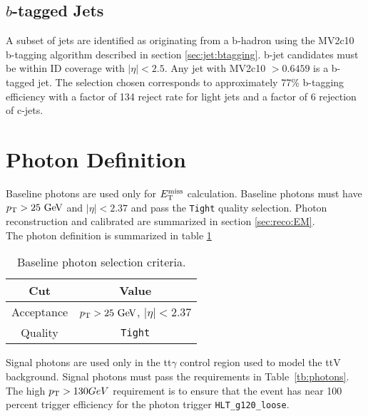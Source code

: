 \subsection{\boldmath $b$-tagged Jets}

\indent A subset of jets are identified as originating from a b-hadron using the MV2c10 b-tagging algorithm described in section \ref{sec:jet:btagging}.  b-jet candidates must be within ID coverage with $|\eta|<2.5$.  Any jet with MV2c10 $ > 0.6459$ is a b-tagged jet.  The selection chosen corresponds to approximately 77\% b-tagging efficiency with a factor of 134 reject rate for light jets and a factor of 6 rejection of c-jets.\\

\section{Photon Definition}
\label{sec:PhoDef}

\indent Baseline photons are used only for $E_{\mathrm{T}}^{\mathrm{miss}}$ calculation.  Baseline photons must have $\pt > 25 \gev$ and $|\eta| < 2.37$ and pass the {\tt Tight} quality selection.  Photon reconstruction and calibrated are summarized in section \ref{sec:reco:EM}. \\

\indent The photon definition is summarized in table \ref{tb:photons:baseline} \\

\begin{table}[htp]
  \caption{Baseline photon selection criteria.} 
  \begin{center}
    \begin{tabular}{c|c} \hline \hline
      Cut & Value \\ \hline \hline
      Acceptance & $\pT > 25 \gev$, $|\eta| < 2.37$ \\ \hline
      Quality & {\tt Tight} \\ \hline
      \hline
    \end{tabular}
  \end{center}
  \label{tb:photons:baseline}
\end{table}%

\indent Signal photons are used only in the tt$\gamma$ control region used to model the ttV background.  Signal photons must pass the requirements in Table~\ref{tb:photons}.  The high $p_{\mathrm{T}} > 130 GeV$ requirement is to ensure that the event has near 100 percent trigger efficiency for the photon trigger {\tt HLT\_g120\_loose}.\\

